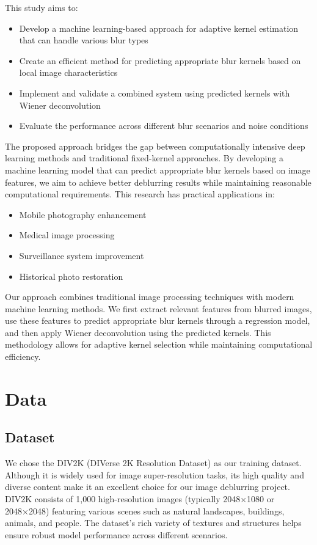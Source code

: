 \documentclass[twoside,11pt]{article}
\begin{document}
\singlespacing
This study aims to:
\begin{itemize}
\item Develop a machine learning-based approach for adaptive kernel estimation that can handle various blur types
\item Create an efficient method for predicting appropriate blur kernels based on local image characteristics
\item Implement and validate a combined system using predicted kernels with Wiener deconvolution
\item Evaluate the performance across different blur scenarios and noise conditions
\end{itemize}
\singlespacing
The proposed approach bridges the gap between computationally intensive deep learning methods and traditional fixed-kernel approaches. By developing a machine learning model that can predict appropriate blur kernels based on image features, we aim to achieve better deblurring results while maintaining reasonable computational requirements. This research has practical applications in:
\begin{itemize}
\item Mobile photography enhancement
\item Medical image processing
\item Surveillance system improvement
\item Historical photo restoration
\end{itemize}
\singlespacing
Our approach combines traditional image processing techniques with modern machine learning methods. We first extract relevant features from blurred images, use these features to predict appropriate blur kernels through a regression model, and then apply Wiener deconvolution using the predicted kernels. This methodology allows for adaptive kernel selection while maintaining computational efficiency.


\section{Data}

\subsection{Dataset}
We chose the DIV2K (DIVerse 2K Resolution Dataset) as our training dataset. Although it is widely used for image super-resolution tasks, its high quality and diverse content make it an excellent choice for our image deblurring project. DIV2K consists of 1,000 high-resolution images (typically 2048×1080 or 2048×2048) featuring various scenes such as natural landscapes, buildings, animals, and people. The dataset’s rich variety of textures and structures helps ensure robust model performance across different scenarios.
\end{document}
